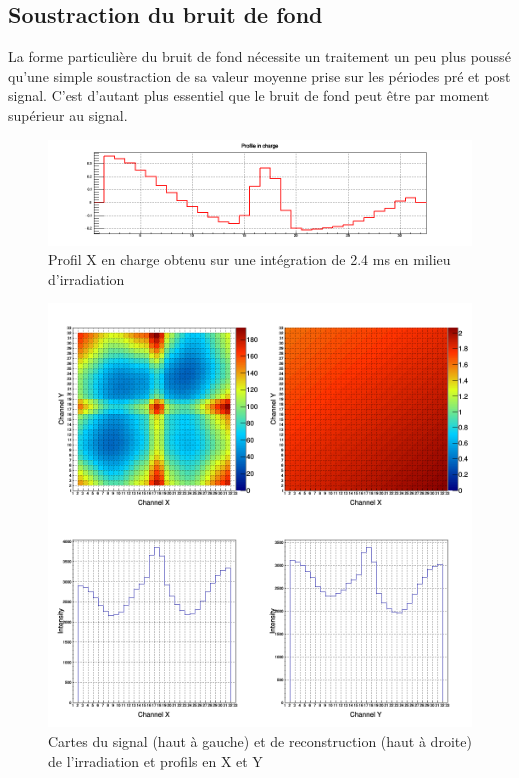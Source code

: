 \documentclass[a4paper,11pt]{article}
\begin{document}
\subsection*{Soustraction du bruit de fond}
La forme particulière du bruit de fond nécessite un traitement un peu plus poussé qu’une simple soustraction de sa valeur moyenne prise sur les périodes pré et post signal.
C'est d'autant plus essentiel que le bruit de fond peut être par moment supérieur au signal.
\begin{figure}[h]
\begin{center}
\includegraphics[scale=0.4]{SFB_396p.png} 
\caption{\label{fig:396p}\footnotesize{Profil X en charge obtenu sur une intégration de 2.4 ms en milieu d'irradiation}}
\end{center}
\end{figure}

\begin{figure}[h]
\begin{center}
\includegraphics[scale=0.4]{Imagep.png} 
\caption{\label{fig:imagep}\footnotesize{Cartes du signal (haut à gauche) et de reconstruction (haut à droite) de l'irradiation et profils en X et Y}}
\end{center}
\end{figure}
\end{document}
